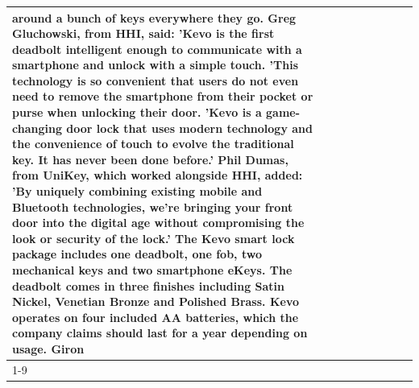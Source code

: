 \begin{table}[H]
\begin{tabular}{lllrlllll}
around a bunch of keys everywhere they go. Greg Gluchowski, from HHI, said: 'Kevo is the first deadbolt intelligent enough to communicate with a smartphone and unlock with a simple touch. 'This technology is so convenient that users do not even need to remove the smartphone from their pocket or purse when unlocking their door. 'Kevo is a game-changing door lock that uses modern technology and the convenience of touch to evolve the traditional key. It has never been done before.' Phil Dumas, from UniKey, which worked alongside HHI, added: 'By uniquely combining existing mobile and Bluetooth technologies, we’re bringing your front door into the digital age without compromising the look or security of the lock.' The Kevo smart lock package includes one deadbolt, one fob, two mechanical keys and two smartphone eKeys. The deadbolt comes in three finishes including Satin Nickel, Venetian Bronze and Polished Brass. Kevo operates on four included AA batteries, which the company claims should last for a year depending on usage. Giron \\
\cline{1-9}

\end{tabular}
\end{table}
